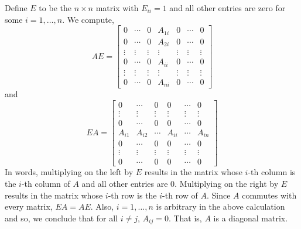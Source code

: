 \documentclass{article}
\begin{document}
Define $E$ to be the $n\times n$ matrix with $E_{ii} = 1$ and all other entries are zero for some $i = 1, \dots, n$. We compute,
	\[ AE = \begin{bmatrix} 0 & \cdots & 0 & A_{1i} & 0 & \cdots & 0\\
					   0 & \cdots & 0 & A_{2i} & 0 & \cdots & 0 \\
					   \vdots & \vdots & \vdots& \vdots& \vdots & \vdots & \vdots \\
					    0 & \cdots & 0 & A_{ii} & 0 & \cdots & 0 \\
					     \vdots & \vdots & \vdots& \vdots& \vdots & \vdots & \vdots \\
					     0 & \cdots & 0 & A_{ni} & 0 & \cdots & 0
		\end{bmatrix}\]
and 
	\[ EA = \begin{bmatrix} 0 & \cdots & 0 & 0 & \cdots & 0\\
					   \vdots & \vdots & \vdots& \vdots& \vdots & \vdots \\
					   0 & \cdots & 0 & 0& \cdots & 0 \\
					    A_{i1} & A_{i2} & \cdots & A_{ii} & \cdots & A_{in} \\
					    0 & \cdots & 0 & 0&  \cdots & 0 \\
					     \vdots & \vdots & \vdots& \vdots& \vdots & \vdots \\
					     0 & \cdots & 0 & 0 &  \cdots & 0
		\end{bmatrix}\]
In words, multiplying on the left by $E$ results in the matrix whose $i$-th column is the $i$-th column of $A$ and all other entries are 0. Multiplying on the right by $E$ results in the matrix whose $i$-th row is the $i$-th row of $A$. Since $A$ commutes with every matrix, $EA = AE$. Also, $i = 1,\dots, n$ is arbitrary in the above calculation and so, we conclude that for all $i\neq j$, $A_{ij} = 0$. That is, $A$ is a diagonal matrix.
\end{document}
